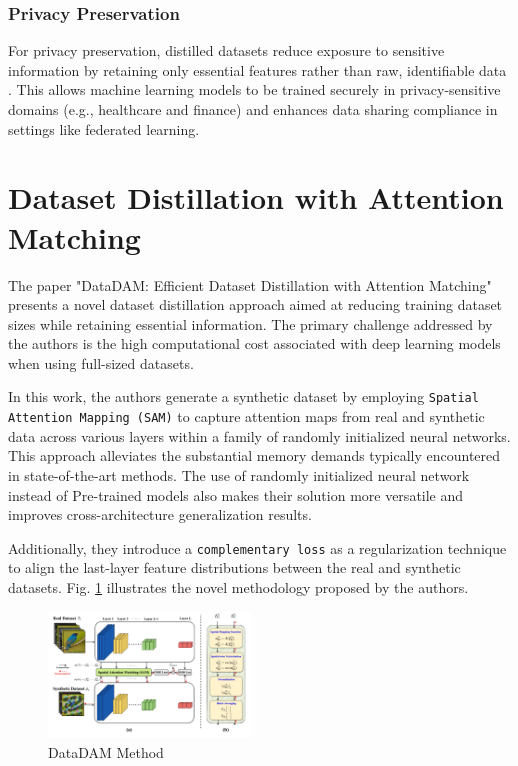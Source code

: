 \documentclass[conference, compsoc]{IEEEtran}
\begin{document}
\subsubsection*{Privacy Preservation}
For privacy preservation, distilled datasets reduce exposure to sensitive information by retaining only essential features rather than raw, identifiable data \cite{dong2022privacyfreedoesdataset}. This allows machine learning models to be trained securely in privacy-sensitive domains (e.g., healthcare and finance) and enhances data sharing compliance in settings like federated learning.

\section{Dataset Distillation with Attention Matching}
The paper "DataDAM: Efficient Dataset Distillation with Attention Matching" \cite{sajedi2023datadamefficientdatasetdistillation} presents a novel dataset distillation approach aimed at reducing training dataset sizes while retaining essential information. The primary challenge addressed by the authors is the high computational cost associated with deep learning models when using full-sized datasets.

In this work, the authors generate a synthetic dataset by employing \texttt{Spatial Attention Mapping (SAM)} to capture attention maps from real and synthetic data across various layers within a family of randomly initialized neural networks. This approach alleviates the substantial memory demands typically encountered in state-of-the-art methods. The use of randomly initialized neural network instead of Pre-trained models also makes their solution more versatile and improves cross-architecture generalization results. 

Additionally, they introduce a \texttt{complementary loss} as a regularization technique to align the last-layer feature distributions between the real and synthetic datasets. Fig. \ref{fig:datadam_method} illustrates the novel methodology proposed by the authors.



\begin{figure}[H]
	\centering
	\includegraphics[width=0.48\textwidth]{datadam.png}
	\caption{DataDAM Method \cite{sajedi2023datadamefficientdatasetdistillation}}
	\label{fig:datadam_method}
\end{figure}
\end{document}
